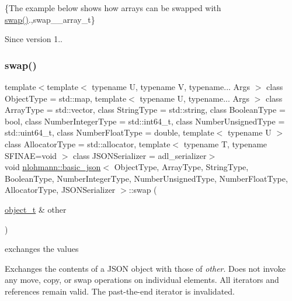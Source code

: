 \{The example below shows how arrays can be swapped with {\ttfamily \mbox{\hyperlink{classnlohmann_1_1basic__json_a8c9d932353e1ab98a7dc2fc27e002031}{swap()}}}.,swap\+\_\+\+\_\+array\+\_\+t\}

\begin{DoxySince}{Since}
version 1.. 
\end{DoxySince}
\mbox{\label{classnlohmann_1_1basic__json_ac31f12587d2f1a3be5ffc394aa9d72a4}} 
\subsubsection{\texorpdfstring{swap()}{swap()}\hspace{0.1cm}{\footnotesize\ttfamily [3/4]}}
{\footnotesize\ttfamily template$<$template$<$ typename U, typename V, typename... Args $>$ class Object\+Type = std\+::map, template$<$ typename U, typename... Args $>$ class Array\+Type = std\+::vector, class String\+Type  = std\+::string, class Boolean\+Type  = bool, class Number\+Integer\+Type  = std\+::int64\+\_\+t, class Number\+Unsigned\+Type  = std\+::uint64\+\_\+t, class Number\+Float\+Type  = double, template$<$ typename U $>$ class Allocator\+Type = std\+::allocator, template$<$ typename T, typename S\+F\+I\+N\+A\+E=void $>$ class J\+S\+O\+N\+Serializer = adl\+\_\+serializer$>$ \\
void \mbox{\hyperlink{classnlohmann_1_1basic__json}{nlohmann\+::basic\+\_\+json}}$<$ Object\+Type, Array\+Type, String\+Type, Boolean\+Type, Number\+Integer\+Type, Number\+Unsigned\+Type, Number\+Float\+Type, Allocator\+Type, J\+S\+O\+N\+Serializer $>$\+::swap (\begin{DoxyParamCaption}\item[{\mbox{\hyperlink{classnlohmann_1_1basic__json_aa1eb13d5aa86f80cbee6c58e90fbaf49}{object\+\_\+t}} \&}]{other }\end{DoxyParamCaption})\hspace{0.3cm}{\ttfamily [inline]}}



exchanges the values 

Exchanges the contents of a J\+S\+ON object with those of {\itshape other}. Does not invoke any move, copy, or swap operations on individual elements. All iterators and references remain valid. The past-\/the-\/end iterator is invalidated.


